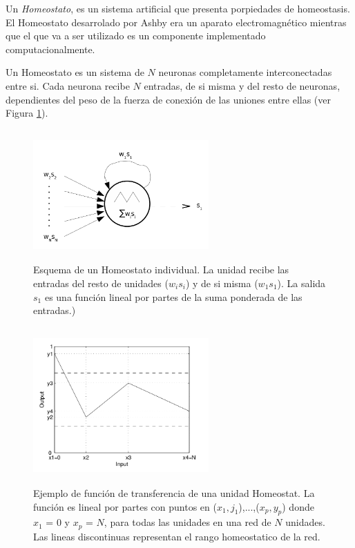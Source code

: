 Un \textit{Homeostato}, es un sistema artificial que presenta porpiedades de homeostasis. El Homeostato desarrolado por Ashby era un aparato
electromagnético mientras que el que va a ser utilizado es un componente implementado computacionalmente.

Un Homeostato es un sistema de $N$ neuronas completamente interconectadas entre si. Cada neurona recibe $N$ entradas, de si misma y del resto de neuronas,
dependientes del peso de la fuerza de conexión de las uniones entre ellas (ver Figura \ref{fig:figuraHomeostatSchema}).

\begin{figure}[!h]
    \centering
    \includegraphics[width=0.6\textwidth,height=5cm]{Imagenes/HomeostatSchema}
    \caption{Esquema de un Homeostato individual. La unidad recibe las entradas del resto de unidades ($w_{i}s_{i}$) y de si misma ($w_{1}s_{1}$). La salida $s_{1}$ es una función lineal por partes
		de la suma ponderada de las entradas.)}
    \label{fig:figuraHomeostatSchema}
\end{figure}

\begin{figure}[!h]
    \centering
    \includegraphics[width=0.6\textwidth,height=6cm]{Imagenes/HomeostatTransfer}
    \caption{Ejemplo de función de transferencia de una unidad Homeostat. La función es lineal por partes con puntos en ($x_{1},j_{1}$),...,($x_{p},y_{p}$) donde $x_{1}$ = 0 y $x_{p}$ = $N$, para todas las
		unidades en una red de $N$ unidades. Las lineas discontinuas representan el rango homeostatico de la red.}
    \label{fig:homeostatTransferFunction}
\end{figure}

